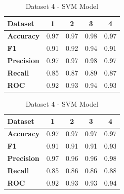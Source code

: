 \begin{table}[H]
\begin{subtable}[H]{0.45\textwidth}
\begin{tabular}{|l|c|c|c|c|}
            \hline
            \textbf{Dataset} & \textbf{1} & \textbf{2} & \textbf{3} & \textbf{4} \\
            \hline
            \textbf{Accuracy} & 0.97 & 0.97 & 0.98 & 0.97 \\
            \textbf{F1} & 0.91 & 0.92 & 0.94 & 0.91 \\
            \textbf{Precision} & 0.97 & 0.97 & 0.98 & 0.97 \\
            \textbf{Recall} & 0.85 & 0.87 & 0.89 & 0.87 \\
            \textbf{ROC} & 0.92 & 0.93 & 0.94 & 0.93 \\
            \hline
        \end{tabular}
        \caption{Dataset 3 - SVM Model}\label{subtab:dataset_3_svm_model}
    \end{subtable}
    \quad
    \begin{subtable}[H]{0.45\textwidth}
        \centering
        \begin{tabular}{|l|c|c|c|c|}
            \hline
            \textbf{Dataset} & \textbf{1} & \textbf{2} & \textbf{3} & \textbf{4} \\
            \hline
            \textbf{Accuracy} & 0.97 & 0.97 & 0.97 & 0.97 \\
            \textbf{F1} & 0.91 & 0.91 & 0.91 & 0.93 \\
            \textbf{Precision} & 0.97 & 0.96 & 0.96 & 0.98 \\
            \textbf{Recall} & 0.85 & 0.86 & 0.86 & 0.88 \\
            \textbf{ROC} & 0.92 & 0.93 & 0.93 & 0.94 \\
            \hline
        \end{tabular}
        \caption{Dataset 4 - SVM Model}\label{subtab:dataset_4_svm_model}
    \end{subtable}
\end{table}

